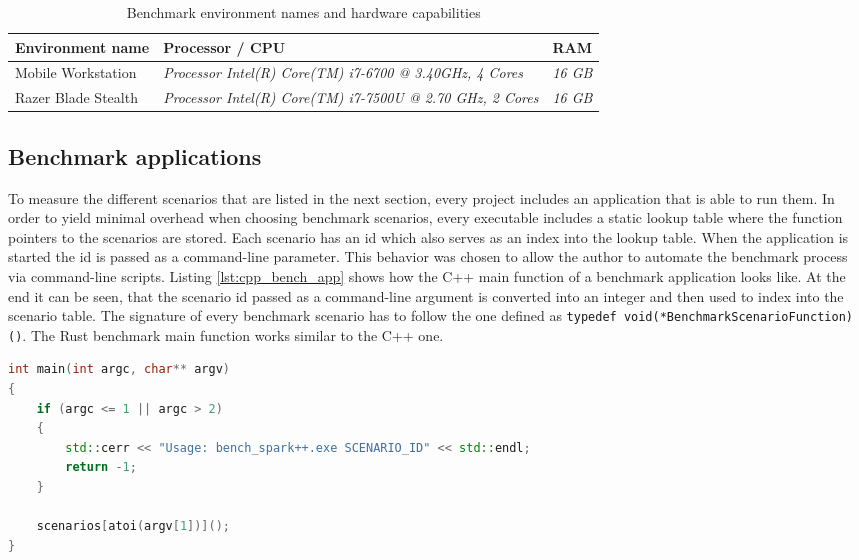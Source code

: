 \begin{table}[h!]
	\centering
	\label{my-label}
	\begin{tabular}{|l|l|l|}
		\hline
		\textbf{Environment name} & \textbf{Processor / CPU} & \textbf{RAM} \\ \hline
		Mobile Workstation	& \textit{Processor	Intel(R) Core(TM) i7-6700 @ 3.40GHz, 4 Cores} & \textit{16 GB} \\ \hline
		Razer Blade Stealth	& \textit{Processor	Intel(R) Core(TM) i7-7500U @ 2.70 GHz, 2 Cores} & \textit{16 GB} \\ \hline
	\end{tabular}
	\caption{Benchmark environment names and hardware capabilities}
\end{table}

\subsection{Benchmark applications}

To measure the different scenarios that are listed in the next section, every project includes an application that is able to run them. In order to yield minimal overhead when choosing benchmark scenarios, every executable includes a static lookup table where the function pointers to the scenarios are stored. Each scenario has an id which also serves as an index into the lookup table. When the application is started the id is passed as a command-line parameter. This behavior was chosen to allow the author to automate the benchmark process via command-line scripts. Listing \ref{lst:cpp_bench_app} shows how the C++ main function of a benchmark application looks like. At the end it can be seen, that the scenario id passed as a command-line argument is converted into an integer and then used to index into the scenario table. The signature of every benchmark scenario has to follow the one defined as \texttt{typedef void(*BenchmarkScenarioFunction)()}. The Rust benchmark main function works similar to the C++ one.\\

\begin{lstlisting}[caption={Main function of the C++ benchmark app using a scenario lookup table}, label={lst:cpp_bench_app}, language={C++}]
int main(int argc, char** argv)
{
	if (argc <= 1 || argc > 2)
	{
		std::cerr << "Usage: bench_spark++.exe SCENARIO_ID" << std::endl;
		return -1;
	}
	
	scenarios[atoi(argv[1])]();
}
\end{lstlisting}

